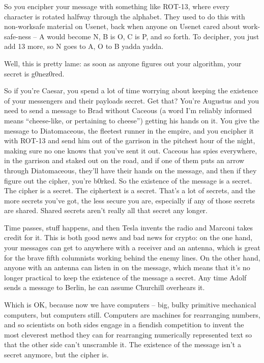 So you encipher your message with something like ROT-13, where
every character is rotated halfway through the alphabet. They used
to do this with non-worksafe material on Usenet, back when anyone
on Usenet cared about work-safe-ness -- A would become N, B is O, C
is P, and so forth. To decipher, you just add 13 more, so N goes to
A, O to B yadda yadda.

Well, this is pretty lame: as soon as anyone figures out your
algorithm, your secret is g0nez0red.

So if you're Caesar, you spend a lot of time worrying about keeping
the existence of your messengers and their payloads secret. Get
that? You're Augustus and you need to send a message to Brad
without Caceous (a word I'm reliably informed means ``cheese-like,
or pertaining to cheese'') getting his hands on it. You give the
message to Diatomaceous, the fleetest runner in the empire, and you
encipher it with ROT-13 and send him out of the garrison in the
pitchest hour of the night, making sure no one knows that you've
sent it out. Caceous has spies everywhere, in the garrison and
staked out on the road, and if one of them puts an arrow through
Diatomaceous, they'll have their hands on the message, and then if
they figure out the cipher, you're b0rked. So the existence of the
message is a secret. The cipher is a secret. The ciphertext is a
secret. That's a lot of secrets, and the more secrets you've got,
the less secure you are, especially if any of those secrets are
shared. Shared secrets aren't really all that secret any longer.

Time passes, stuff happens, and then Tesla invents the radio and
Marconi takes credit for it. This is both good news and bad news
for crypto: on the one hand, your messages can get to anywhere with
a receiver and an antenna, which is great for the brave fifth
columnists working behind the enemy lines. On the other hand,
anyone with an antenna can listen in on the message, which means
that it's no longer practical to keep the existence of the message
a secret. Any time Adolf sends a message to Berlin, he can assume
Churchill overhears it.

Which is OK, because now we have computers -- big, bulky primitive
mechanical computers, but computers still. Computers are machines
for rearranging numbers, and so scientists on both sides engage in
a fiendish competition to invent the most cleverest method they can
for rearranging numerically represented text so that the other side
can't unscramble it. The existence of the message isn't a secret
anymore, but the cipher is.

